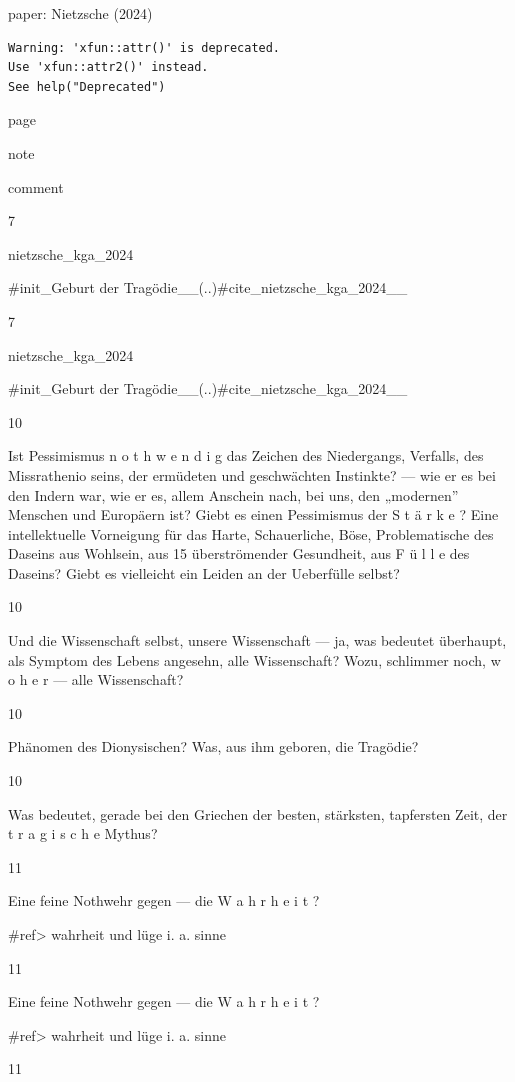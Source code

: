 \documentclass[
  letterpaper,
  DIV=11,
  numbers=noendperiod]{scrartcl}
\begin{document}
paper: Nietzsche (2024)

\begin{verbatim}
Warning: 'xfun::attr()' is deprecated.
Use 'xfun::attr2()' instead.
See help("Deprecated")
\end{verbatim}

page

note

comment

7

nietzsche\_kga\_2024

\#init\_Geburt der Tragödie\_\_(..)\#cite\_nietzsche\_kga\_2024\_\_

7

nietzsche\_kga\_2024

\#init\_Geburt der Tragödie\_\_(..)\#cite\_nietzsche\_kga\_2024\_\_

10

Ist Pessimismus n o t h w e n d i g das Zeichen des Niedergangs,
Verfalls, des Missrathenio seins, der ermüdeten und geschwächten
Instinkte? --- wie er es bei den Indern war, wie er es, allem Anschein
nach, bei uns, den „modernen'' Menschen und Europäern ist? Giebt es
einen Pessimismus der S t ä r k e ? Eine intellektuelle Vorneigung für
das Harte, Schauerliche, Böse, Problematische des Daseins aus Wohlsein,
aus 15 überströmender Gesundheit, aus F ü l l e des Daseins? Giebt es
vielleicht ein Leiden an der Ueberfülle selbst?

10

Und die Wissenschaft selbst, unsere Wissenschaft --- ja, was bedeutet
überhaupt, als Symptom des Lebens angesehn, alle Wissenschaft? Wozu,
schlimmer noch, w o h e r --- alle Wissenschaft?

10

Phänomen des Dionysischen? Was, aus ihm geboren, die Tragödie?

10

Was bedeutet, gerade bei den Griechen der besten, stärksten, tapfersten
Zeit, der t r a g i s c h e Mythus?

11

Eine feine Nothwehr gegen --- die W a h r h e i t ?

\#ref\textgreater{} wahrheit und lüge i. a. sinne

11

Eine feine Nothwehr gegen --- die W a h r h e i t ?

\#ref\textgreater{} wahrheit und lüge i. a. sinne

11
\end{document}
